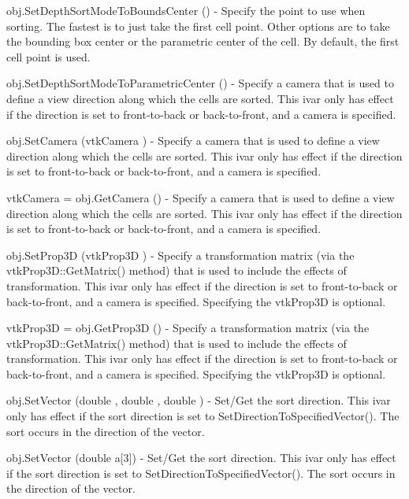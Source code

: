\begin{DoxyItemize}
\item {\ttfamily obj.\-Set\-Depth\-Sort\-Mode\-To\-Bounds\-Center ()} -\/ Specify the point to use when sorting. The fastest is to just take the first cell point. Other options are to take the bounding box center or the parametric center of the cell. By default, the first cell point is used.  
\item {\ttfamily obj.\-Set\-Depth\-Sort\-Mode\-To\-Parametric\-Center ()} -\/ Specify a camera that is used to define a view direction along which the cells are sorted. This ivar only has effect if the direction is set to front-\/to-\/back or back-\/to-\/front, and a camera is specified.  
\item {\ttfamily obj.\-Set\-Camera (vtk\-Camera )} -\/ Specify a camera that is used to define a view direction along which the cells are sorted. This ivar only has effect if the direction is set to front-\/to-\/back or back-\/to-\/front, and a camera is specified.  
\item {\ttfamily vtk\-Camera = obj.\-Get\-Camera ()} -\/ Specify a camera that is used to define a view direction along which the cells are sorted. This ivar only has effect if the direction is set to front-\/to-\/back or back-\/to-\/front, and a camera is specified.  
\item {\ttfamily obj.\-Set\-Prop3\-D (vtk\-Prop3\-D )} -\/ Specify a transformation matrix (via the vtk\-Prop3\-D\-::\-Get\-Matrix() method) that is used to include the effects of transformation. This ivar only has effect if the direction is set to front-\/to-\/back or back-\/to-\/front, and a camera is specified. Specifying the vtk\-Prop3\-D is optional.  
\item {\ttfamily vtk\-Prop3\-D = obj.\-Get\-Prop3\-D ()} -\/ Specify a transformation matrix (via the vtk\-Prop3\-D\-::\-Get\-Matrix() method) that is used to include the effects of transformation. This ivar only has effect if the direction is set to front-\/to-\/back or back-\/to-\/front, and a camera is specified. Specifying the vtk\-Prop3\-D is optional.  
\item {\ttfamily obj.\-Set\-Vector (double , double , double )} -\/ Set/\-Get the sort direction. This ivar only has effect if the sort direction is set to Set\-Direction\-To\-Specified\-Vector(). The sort occurs in the direction of the vector.  
\item {\ttfamily obj.\-Set\-Vector (double a\mbox{[}3\mbox{]})} -\/ Set/\-Get the sort direction. This ivar only has effect if the sort direction is set to Set\-Direction\-To\-Specified\-Vector(). The sort occurs in the direction of the vector.  

\end{DoxyItemize}
